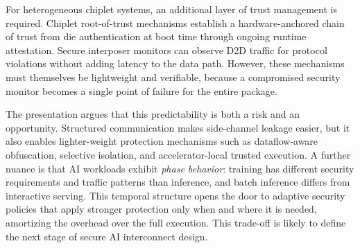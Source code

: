 For heterogeneous chiplet systems, an additional layer of trust management is required. Chiplet root-of-trust mechanisms establish a hardware-anchored chain of trust from die authentication at boot time through ongoing runtime attestation. Secure interposer monitors can observe D2D traffic for protocol violations without adding latency to the data path. However, these mechanisms must themselves be lightweight and verifiable, because a compromised security monitor becomes a single point of failure for the entire package.

The presentation argues that this predictability is both a risk and an opportunity. Structured communication makes side-channel leakage easier, but it also enables lighter-weight protection mechanisms such as dataflow-aware obfuscation, selective isolation, and accelerator-local trusted execution. A further nuance is that AI workloads exhibit \emph{phase behavior}: training has different security requirements and traffic patterns than inference, and batch inference differs from interactive serving. This temporal structure opens the door to adaptive security policies that apply stronger protection only when and where it is needed, amortizing the overhead over the full execution. This trade-off is likely to define the next stage of secure AI interconnect design.
